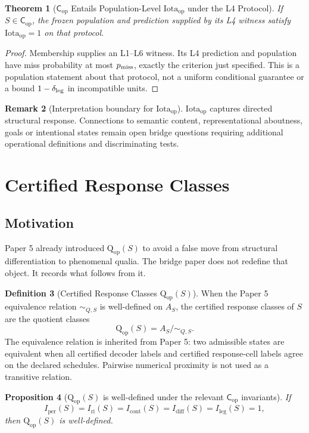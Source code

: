 \documentclass[11pt,a4paper]{article}
\newtheorem{theorem}{Theorem}[section]
\newtheorem{proposition}[theorem]{Proposition}
\theoremstyle{definition}
\newtheorem{definition}[theorem]{Definition}
\newtheorem{remark}[theorem]{Remark}
\newcommand{\Cop}{\mathsf{C}_{\mathrm{op}}}
\newcommand{\Qop}{\mathrm{Q}_{\mathrm{op}}}
\newcommand{\Iotaop}{\mathrm{Iota}_{\mathrm{op}}}
\newcommand{\Aset}{A_S}
\newcommand{\Iper}{I_{\mathrm{per}}}
\newcommand{\Iri}{I_{\mathrm{ri}}}
\newcommand{\Icont}{I_{\mathrm{cont}}}
\newcommand{\Idiff}{I_{\mathrm{diff}}}
\newcommand{\Ileg}{I_{\mathrm{leg}}}
\begin{document}
\begin{theorem}[$\Cop$ Entails Population-Level $\Iotaop$ under the L4 Protocol]\label{thm:cop-entails-iota}
If $S\in\Cop$, the frozen population and prediction supplied by its L4 witness satisfy $\Iotaop=1$ on that protocol.
\end{theorem}
\begin{proof}
Membership supplies an L1--L6 witness. Its L4 prediction and population have miss probability at most $p_{\rm miss}$, exactly the criterion just specified. This is a population statement about that protocol, not a uniform conditional guarantee or a bound $1-\delta_{\rm leg}$ in incompatible units.
\end{proof}

\begin{remark}[Interpretation boundary for $\Iotaop$]
$\Iotaop$ captures directed structural response. Connections to semantic content, representational aboutness, goals or intentional states remain open bridge questions requiring additional operational definitions and discriminating tests.
\end{remark}

\section{Certified Response Classes}

\subsection{Motivation}
Paper 5 already introduced $\Qop(S)$ to avoid a false move from structural differentiation to phenomenal qualia. The bridge paper does not redefine that object. It records what follows from it.

\begin{definition}[Certified Response Classes $\Qop(S)$]\label{def:qop-bridge}
When the Paper 5 equivalence relation $\sim_{Q,S}$ is well-defined on $\Aset$, the certified response classes of $S$ are the quotient classes
\[
\Qop(S)=\Aset/\sim_{Q,S}.
\]
The equivalence relation is inherited from Paper 5: two admissible states are equivalent when all certified decoder labels and certified response-cell labels agree on the declared schedules. Pairwise numerical proximity is not used as a transitive relation.
\end{definition}

\begin{proposition}[$\Qop(S)$ is well-defined under the relevant $\Cop$ invariants]\label{prop:qop-well-defined-bridge}
If
\[
\Iper(S)=\Iri(S)=\Icont(S)=\Idiff(S)=\Ileg(S)=1,
\]
then $\Qop(S)$ is well-defined.
\end{proposition}
\end{document}
